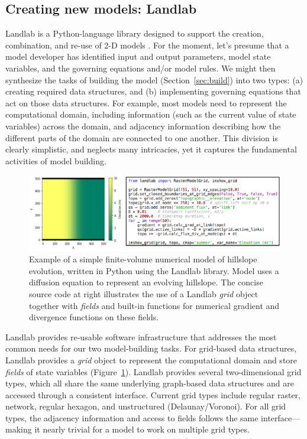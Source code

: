 \documentclass[12pt]{amsart}
\begin{document}
\subsection{Creating new models: Landlab}

Landlab is a Python-language library designed to support the creation, combination, and re-use of 2-D models \citep{hobley2017creative, barnhart2020short}. For the moment, let's presume that a model developer has identified input and output parameters, model state variables, and the governing equations and/or model rules. We might then synthesize the tasks of building the model (Section~\ref{sec:build}) into two types: (a) creating required data structures, and (b) implementing governing equations that act on those data structures. For example, most models need to represent the computational domain, including information (such as the current value of state variables) across the domain, and adjacency information describing how the different parts of the domain are connected to one another. This division is clearly simplistic, and neglects many intricacies, yet it captures the fundamental activities of model building. 

\begin{figure}[h!]
\centering
\includegraphics{Figures/simple_landlab_diffusion_model.pdf}
\caption{Example of a simple finite-volume numerical model of hillslope evolution, written in Python using the Landlab library. Model uses a diffusion equation to represent an evolving hillslope. The concise source code at right illustrates the use of a Landlab \textit{grid} object together with \textit{fields} and built-in functions for numerical gradient and divergence functions on these fields.}
\label{fig:landlabdiffusion}
\end{figure}


Landlab provides re-usable software infrastructure that addresses the most common needs for our two model-building tasks. For grid-based data structures, Landlab provides a \textit{grid} object to represent the computational domain and store \textit{fields} of state variables (Figure~\ref{fig:landlabdiffusion}). Landlab provides several two-dimensional grid types, which all share the same underlying graph-based data structures and are accessed through a consistent interface. Current grid types include regular raster, network, regular hexagon, and unstructured (Delaunay/Voronoi). For all grid types, the adjacency information and access to fields follows the same interface---making it nearly trivial for a model to work on multiple grid types. 
\end{document}
